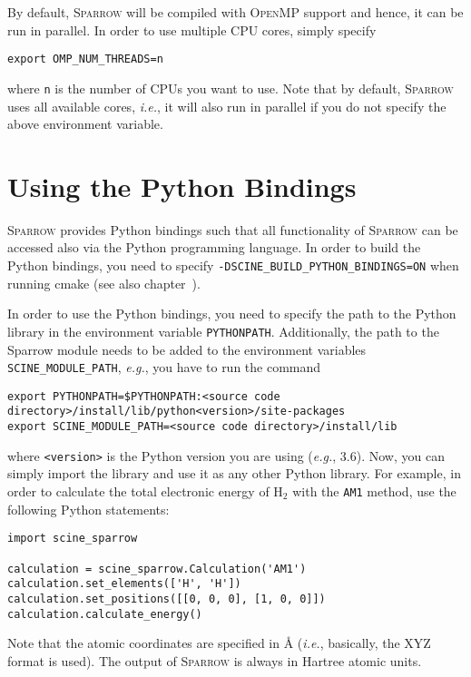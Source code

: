 \documentclass[]{tufte-book}
\begin{document}
By default, \textsc{Sparrow} will be compiled with \textsc{OpenMP} support and hence, it can be run in parallel. In order
to use multiple CPU cores, simply specify
\begin{verbatim}
export OMP_NUM_THREADS=n
\end{verbatim}
where \texttt{n} is the number of CPUs you want to use. Note that by default, \textsc{Sparrow} uses all available cores,
\textit{i.e.}, it will also run in parallel if you do not specify the above environment variable.



\chapter{Using the Python Bindings}

\textsc{Sparrow} provides Python bindings such that all functionality of \textsc{Sparrow} can be accessed also via the
Python programming language. In order to build the Python bindings, you need to specify \texttt{-DSCINE\_BUILD\_PYTHON\_BINDINGS=ON}
when running cmake (see also chapter~).

In order to use the Python bindings, you need to specify the path to the Python library in the environment variable
\texttt{PYTHONPATH}. Additionally, the path to the Sparrow module needs to be added to the environment variables
\texttt{SCINE\_MODULE\_PATH}, \textit{e.g.}, you have to run the command
\begin{verbatim}
export PYTHONPATH=$PYTHONPATH:<source code directory>/install/lib/python<version>/site-packages
export SCINE_MODULE_PATH=<source code directory>/install/lib
\end{verbatim}
where \texttt{<version>} is the Python version you are using (\textit{e.g.}, 3.6). Now, you can simply import the library 
and use it as any other Python library. For example, in order to calculate the total electronic energy of H$_2$ with the 
\texttt{AM1} method, use the following Python statements:
\begin{verbatim}
import scine_sparrow

calculation = scine_sparrow.Calculation('AM1')
calculation.set_elements(['H', 'H'])
calculation.set_positions([[0, 0, 0], [1, 0, 0]])
calculation.calculate_energy()
\end{verbatim}
Note that the atomic coordinates are specified in \AA{} (\textit{i.e.}, basically, the XYZ format is used). The output
of \textsc{Sparrow} is always in Hartree atomic units.
\end{document}
